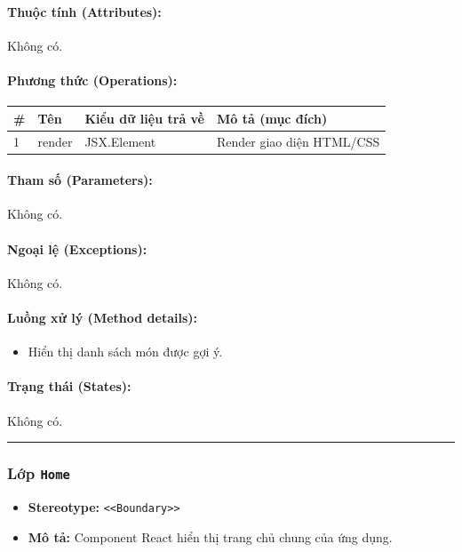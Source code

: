 \documentclass[12pt,a4paper]{article}
\begin{document}
\paragraph{Thuộc tính (Attributes):}
Không có.

\paragraph{Phương thức (Operations):}
\begin{longtable}{|p{0.6cm}|p{5.0cm}|p{2.8cm}|p{5.4cm}|}
\hline
\textbf{\#} & \textbf{Tên} & \textbf{Kiểu dữ liệu trả về} & \textbf{Mô tả (mục đích)} \\ \hline
\endhead
1 & render & JSX.Element & Render giao diện HTML/CSS \\ \hline
\end{longtable}

\paragraph{Tham số (Parameters):}
Không có.

\paragraph{Ngoại lệ (Exceptions):}
Không có.

\paragraph{Luồng xử lý (Method details):}
\begin{itemize}[leftmargin=*]
    \item Hiển thị danh sách món được gợi ý.
\end{itemize}


\paragraph{Trạng thái (States):}
Không có.

\vskip 0.5cm
\noindent\rule{\textwidth}{0.5pt}
\vskip 0.5cm

\subsubsection{Lớp \texttt{Home}}

\begin{itemize}[leftmargin=*]
    \item \textbf{Stereotype:} \texttt{\textless{}\textless{}Boundary\textgreater{}\textgreater{}}
    \item \textbf{Mô tả:} Component React hiển thị trang chủ chung của ứng dụng.
\end{itemize}
\end{document}
